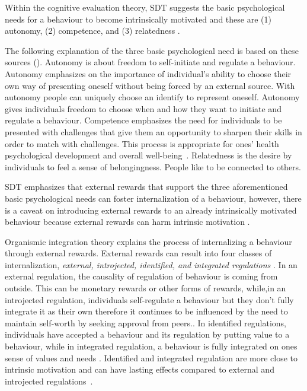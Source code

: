 \documentclass{sig-alternate}
\begin{document}
Within the cognitive evaluation theory, SDT suggests the basic psychological needs for a behaviour to become intrinsically motivated and these are (1) autonomy, (2) competence, and (3) relatedness \cite{deci1985:intrinsic}.

The following explanation of the three basic psychological need is based on these sources (\cite{deci1985:intrinsic,ryan2000:self,lee2015:relating}). Autonomy is about freedom to self-initiate and regulate a behaviour. Autonomy emphasizes on the importance of individual's ability to choose their own way of presenting oneself without being forced by an external source. With autonomy people can uniquely choose an identify to represent oneself. Autonomy gives individuals freedom to choose when and how they want to initiate and regulate a behaviour. Competence emphasizes the need for individuals to be presented with challenges that give them an opportunity to sharpen their skills in order to match with challenges. This process is appropriate for ones' health psychological development and  overall well-being~\cite{zhang2008:motivational}. Relatedness is the desire by individuals to feel a sense of belongingness. People like to be connected to others.

SDT emphasizes that external rewards that support the three aforementioned basic psychological needs can foster internalization of a behaviour, however, there is a caveat on introducing external rewards to an already intrinsically motivated behaviour because external rewards can harm intrinsic motivation \cite{ryan2000:self}.

Organismic integration theory explains the process of internalizing a behaviour through external rewards. External rewards can result into four classes of internalization, \emph{external, introjected, identified, and integrated regulations} \cite{ryan2000:self,lee2015:relating}. In an external regulation, the causality of  regulation of behaviour is coming from outside. This can be monetary rewards or other forms of rewards, while,in an introjected regulation, individuals self-regulate a behaviour but they don't fully integrate it as their own therefore it continues to be influenced by the need to maintain self-worth by seeking approval from peers.\cite {lee2015:relating}. In identified  regulations, individuals have accepted a behaviour and its regulation by putting value to a behaviour, while in integrated regulation,  a behaviour is fully integrated on ones sense of values and needs \cite{lee2015:relating}. Identified and integrated regulation are more close to intrinsic motivation and can have lasting effects compared to external and introjected regulations~\cite{ryan2000intrinsic}.
\end{document}
